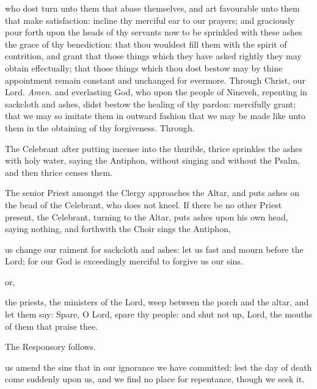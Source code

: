 {} who dost turn unto them that abase themselves, and art favourable unto them that make satisfaction: incline thy merciful ear to our prayers; and graciously pour forth upon the heads of thy servants now to be sprinkled with these ashes the grace of thy benediction: that thou wouldest fill them with the spirit of contrition, and grant that those things which they have asked rightly they may obtain effectually; that those things which thou dost bestow may by thine appointment remain constant and unchanged for evermore. Through Christ, our Lord. \textit{Amen.}
{} and everlasting God, who upon the people of Nineveh, repenting in sackcloth and ashes, didst bestow the healing of thy pardon: mercifully grant; that we may so imitate them in outward fashion that we may be made like unto them in the obtaining of thy forgiveness. Through.
\begin{rubric}
    The Celebrant after putting incense into the thurible, thrice sprinkles the ashes with holy water, saying the Antiphon,  without singing and without the Psalm, and then thrice censes them.
\end{rubric}
\begin{rubric}
    The senior Priest amongst the Clergy approaches the Altar, and puts ashes on the bead of the Celebrant, who does not kneel. If there be no other Priest present, the Celebrant, turning to the Altar, puts ashes upon his own head, saying nothing, and forthwith the Choir sings the Antiphon,
\end{rubric}
 us change our raiment for sackcloth and ashes: let us fast and mourn before the Lord; for our God is exceedingly merciful to forgive us our sins.
\begin{inhead}
    or,
\end{inhead}
 the priests, the ministers of the Lord, weep between the porch and the altar, and let them say: Spare, O Lord, spare thy people: and shut not up, Lord, the mouths of them that praise thee.
\begin{rubric}
    The Responsory follows.
\end{rubric}
 us amend the sins that in our ignorance we have committed: lest the day of death come suddenly upon us, and we find no place for repentance, though we seek it.\par
{}
